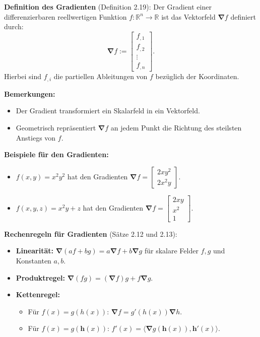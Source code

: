 \documentclass[a4paper,12pt]{article}
\begin{document}
\noindent
\textbf{Definition des Gradienten} (Definition 2.19):
Der Gradient einer differenzierbaren reellwertigen Funktion $f: \mathbb{R}^n \to \mathbb{R}$ ist das Vektorfeld $\boldsymbol{\nabla} f$ definiert durch:
\[
\boldsymbol{\nabla} f := \begin{bmatrix}
    f_{,1} \\
    f_{,2} \\
    \vdots \\
    f_{,n}
\end{bmatrix}.
\]
Hierbei sind $f_{,i}$ die partiellen Ableitungen von $f$ bezüglich der Koordinaten.

\noindent
\textbf{Bemerkungen:}
\begin{itemize}
  \item Der Gradient transformiert ein Skalarfeld in ein Vektorfeld.
  \item Geometrisch repräsentiert $\boldsymbol{\nabla} f$ an jedem Punkt die Richtung des steilsten Anstiegs von $f$.
\end{itemize}

\noindent
\textbf{Beispiele für den Gradienten:}
\begin{itemize}
  \item $f(x, y) = x^2 y^2$ hat den Gradienten $\boldsymbol{\nabla} f = \begin{bmatrix} 2xy^2 \\ 2x^2y \end{bmatrix}$.
  \item $f(x, y, z) = x^2 y + z$ hat den Gradienten $\boldsymbol{\nabla} f = \begin{bmatrix} 2xy \\ x^2 \\ 1 \end{bmatrix}$.
\end{itemize}

\noindent
\textbf{Rechenregeln für Gradienten} (Sätze 2.12 und 2.13):
\begin{itemize}
  \item \textbf{Linearität:} $\boldsymbol{\nabla} (a f + b g) = a \boldsymbol{\nabla} f + b \boldsymbol{\nabla} g$ für skalare Felder $f, g$ und Konstanten $a, b$.
  \item \textbf{Produktregel:} $\boldsymbol{\nabla} (f g) = (\boldsymbol{\nabla} f) g + f \boldsymbol{\nabla} g$.
  \item \textbf{Kettenregel:}
    \begin{itemize}
      \item Für $f(x) = g(h(x))$: $\boldsymbol{\nabla} f = g'(h(x)) \boldsymbol{\nabla} h$.
      \item Für $f(x) = g(\mathbf{h}(x))$: $f'(x) = \langle \boldsymbol{\nabla} g(\mathbf{h}(x)), \mathbf{h}'(x) \rangle$.
    \end{itemize}
\end{itemize}
\end{document}
